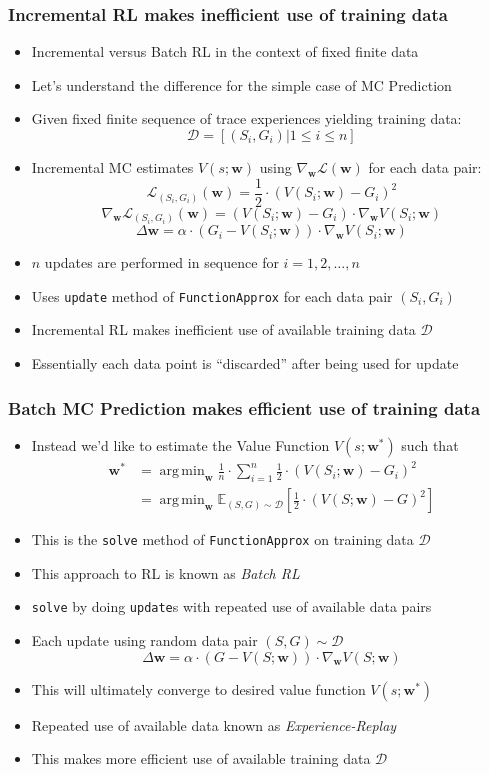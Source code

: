 \documentclass[handout]{beamer}
\DeclareMathOperator*{\argmin}{arg\,min}
\begin{document}
\begin{frame}
\frametitle{Incremental RL makes inefficient use of training data}
\begin{itemize}[<+->]
\item Incremental versus Batch RL in the context of fixed finite data
\item Let's understand the difference for the simple case of MC Prediction
\item Given fixed finite sequence of trace experiences yielding training data:
$$\mathcal{D} = [(S_i, G_i) | 1 \leq i \leq n]$$
\item Incremental MC estimates $V(s;\bm{w})$ using $\nabla_{\bm{w}} \mathcal{L}(\bm{w})$ for each data pair:
$$\mathcal{L}_{(S_i, G_i)}(\bm{w}) = \frac 1 2 \cdot (V(S_i; \bm{w}) - G_i)^2$$
$$\nabla_{\bm{w}} \mathcal{L}_{(S_i, G_i)}(\bm{w}) = (V(S_i; \bm{w}) - G_i) \cdot \nabla_{\bm{w}} V(S_i; \bm{w})$$
$$\Delta \bm{w} = \alpha \cdot (G_i - V(S_i; \bm{w})) \cdot \nabla_{\bm{w}} V(S_i; \bm{w})$$
\item $n$ updates are performed in sequence for $i = 1, 2, \ldots ,n$
\item Uses  \lstinline{update} method of \lstinline{FunctionApprox} for each data pair $(S_i, G_i)$
\item Incremental RL makes inefficient use of available training data $\mathcal{D}$
\item Essentially each data point is ``discarded'' after being used for update
\end{itemize}
\end{frame}


\begin{frame}
\frametitle{Batch MC Prediction makes efficient use of training data}
\pause
\begin{itemize}[<+->]
\item Instead we'd like to estimate the Value Function $V(s;\bm{w^*})$ such that
\begin{align*}
\bm{w^*} & = \argmin_{\bm{w}} \frac 1 n \cdot \sum_{i=1}^n \frac 1 2 \cdot (V(S_i;\bm{w}) - G_i)^2 \\
& = \argmin_{\bm{w}} \mathbb{E}_{(S,G) \sim \mathcal{D}} [\frac 1 2 \cdot (V(S; \bm{w}) - G)^2]
\end{align*}
\item This is the \lstinline{solve} method of \lstinline{FunctionApprox} on training data $\mathcal{D}$
\item This approach to RL is known as {\em Batch RL}
\item \lstinline{solve} by doing \lstinline{update}s with repeated use of available data pairs
\item Each update using random data pair $(S,G) \sim \mathcal{D}$
$$\Delta \bm{w} = \alpha \cdot (G - V(S; \bm{w})) \cdot \nabla_{\bm{w}} V(S; \bm{w})$$
\item This will ultimately converge to desired value function $V(s;\bm{w^*})$
\item Repeated use of available data  known as {\em Experience-Replay} 
\item This makes more efficient use of available training data $\mathcal{D}$
\end{itemize}
\end{frame}
\end{document}
